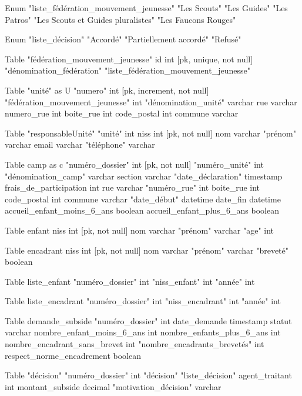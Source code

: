 
Enum "liste_fédération_mouvement_jeunesse" {
  "Les Scouts"
  "Les Guides"
  "Les Patros"
  "Les Scouts et Guides pluralistes"
  "Les Faucons Rouges"
}

Enum "liste_décision"{
  "Accordé"
  "Partiellement accordé"
  "Refusé"
}

Table "fédération_mouvement_jeunesse" {
  id int [pk, unique, not null]
  "dénomination_fédération" "liste_fédération_mouvement_jeunesse"
}



Table "unité" as U {
  "numero" int [pk, increment, not null] %
  "fédération_mouvement_jeunesse" int
  "dénomination_unité" varchar
  rue varchar
  numero_rue int
  boite_rue int
  code_postal int
  commune varchar
}

Table "responsableUnité" {
  "unité" int
  niss int [pk, not null]
  nom varchar
  "prénom" varchar
  email varchar
  "téléphone" varchar
}

Table camp as c {
  "numéro_dossier" int [pk, not null]
  "numéro_unité" int 
  "dénomination_camp" varchar
  section varchar
  "date_déclaration" timestamp
  frais_de_participation int
  rue varchar
  "numéro_rue" int
  boite_rue int
  code_postal int
  commune varchar
  "date_début" datetime
  date_fin datetime
  accueil_enfant_moins_6_ans boolean
  accueil_enfant_plus_6_ans boolean
}

Table enfant {
  niss int [pk,  not null]
  nom varchar
  "prénom" varchar
  "age" int
}

Table encadrant {
  niss int [pk, not null]
  nom varchar
  "prénom" varchar
  "breveté" boolean
}


Table liste_enfant {
  "numéro_dossier" int
  "niss_enfant" int
   "année" int
}

Table liste_encadrant {
  "numéro_dossier" int
  "niss_encadrant" int
  "année" int
}


Table demande_subside {
  "numéro_dossier" int 
  date_demande timestamp
  statut varchar
  nombre_enfant_moins_6_ans int
  nombre_enfants_plus_6_ans int
  nombre_encadrant_sans_brevet int
  "nombre_encadrants_brevetés" int
  respect_norme_encadrement boolean
}



Table "décision" {
  "numéro_dossier" int
  "décision" "liste_décision"
  agent_traitant int
  montant_subside decimal
  "motivation_décision" varchar
}



